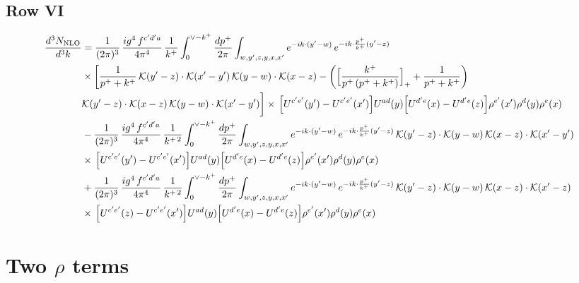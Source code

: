 \documentclass[9pt]{article}
\numberwithin{equation}{section}
\begin{document}
\subsection{Row VI}
\begin{align}
\frac{d^{3}N_{\rm NLO}}{d^{3}k}&=\frac{1}{(2\pi)^{3}}\,\frac{ig^{4}\,f^{c^{\prime}d^{\prime}a}}{4\pi^{4}}\,\frac{1}{k^{+}}\int_{0}^{\vee-k^{+}}\frac{dp^{+}}{2\pi}\int_{w,y^{\prime},z,y,x,x^{\prime}}e^{-ik\cdot(y^{\prime}-w)}\,e^{-ik\cdot\frac{p^{+}}{k^{+}}(y^{\prime}-z)}\notag\\&\times\bigg[\frac{1}{p^{+}+k^{+}}\,\mathcal{K}(y^{\prime}-z)\cdot\mathcal{K}(x^{\prime}-y^{\prime})\,\mathcal{K}(y-w)\cdot\mathcal{K}(x-z)-\bigg(\Big[\frac{k^{+}}{p^{+}\,(p^{+}+k^{+})}\Big]_{+}+\frac{1}{p^{+}+k^{+}}\bigg)\notag \\ & \mathcal{K}(y^{\prime}-z)\cdot\mathcal{K}(x-z)\,\mathcal{K}(y-w)\cdot\mathcal{K}(x^{\prime}-y^{\prime})\bigg]\times\,\Big[U^{c^{\prime}e^{\prime}}(y^{\prime})-U^{c^{\prime}e^{\prime}}(x^{\prime})\Big]U^{ad}(y)\Big[U^{d^{\prime}e}(x)-U^{d^{\prime}e}(z)\Big]\rho^{e^{\prime}}(x^{\prime})\rho^{d}(y)\rho^{e}(x)\notag\\&-\frac{1}{(2\pi)^{3}}\,\frac{ig^{4}\,f^{c^{\prime}d^{\prime}a}}{4\pi^{4}}\,\frac{1}{k^{+\,2}}\int_{0}^{\vee-k^{+}}\frac{dp^{+}}{2\pi}\int_{w,y^{\prime},z,y,x,x^{\prime}}e^{-ik\cdot(y^{\prime}-w)}\,e^{-ik\cdot\frac{p^{+}}{k^{+}}(y^{\prime}-z)}\,\mathcal{K}(y^{\prime}-z)\cdot\mathcal{K}(y-w)\,\mathcal{K}(x-z)\cdot\mathcal{K}(x^{\prime}-y^{\prime})\notag\\&\times\,\Big[U^{c^{\prime}e^{\prime}}(y^{\prime})-U^{c^{\prime}e^{\prime}}(x^{\prime})\Big]U^{ad}(y)\Big[U^{d^{\prime}e}(x)-U^{d^{\prime}e}(z)\Big]\rho^{e^{\prime}}(x^{\prime})\rho^{d}(y)\rho^{e}(x)\notag\\&+\frac{1}{(2\pi)^{3}}\,\frac{ig^{4}\,f^{c^{\prime}d^{\prime}a}}{4\pi^{4}}\,\frac{1}{k^{+\,2}}\int_{0}^{\vee-k^{+}}\frac{dp^{+}}{2\pi}\int_{w,y^{\prime},z,y,x,x^{\prime}}e^{-ik\cdot(y^{\prime}-w)}\,e^{-ik\cdot\frac{p^{+}}{k^{+}}(y^{\prime}-z)}\,\mathcal{K}(y^{\prime}-z)\cdot\mathcal{K}(y-w)\,\mathcal{K}(x-z)\cdot\mathcal{K}(x^{\prime}-z)\notag\\&\times\,\Big[U^{c^{\prime}e^{\prime}}(z)-U^{c^{\prime}e^{\prime}}(x^{\prime})\Big]U^{ad}(y)\Big[U^{d^{\prime}e}(x)-U^{d^{\prime}e}(z)\Big]\rho^{e^{\prime}}(x^{\prime})\rho^{d}(y)\rho^{e}(x)
\end{align}
\section*{Two $\rho$ terms}
\end{document}
